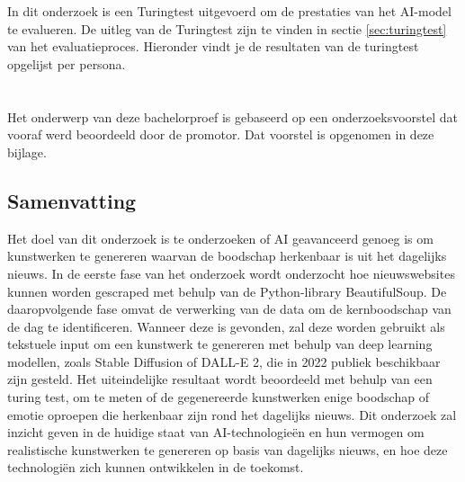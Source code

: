 \documentclass[dutch,dit,thesis]{hogentreport}
\begin{document}








%
%



\appendix
\chapter{}%
\label{ch:code_fragments}



\chapter{}%
In dit onderzoek is een Turingtest uitgevoerd om de prestaties van het AI-model te evalueren. De uitleg van de Turingtest zijn te vinden in sectie \ref{sec:turingtest} van het evaluatieproces. Hieronder vindt je de resultaten van de turingtest opgelijst per persona. 


\chapter{}%
Het onderwerp van deze bachelorproef is gebaseerd op een onderzoeksvoorstel dat vooraf werd beoordeeld door de promotor. Dat voorstel is opgenomen in deze bijlage.


\section*{Samenvatting}
Het doel van dit onderzoek is te onderzoeken of AI geavanceerd genoeg is om kunstwerken te genereren waarvan de boodschap herkenbaar is uit het dagelijks nieuws. In de eerste fase van het onderzoek wordt onderzocht hoe nieuwswebsites kunnen worden gescraped met behulp van de Python-library BeautifulSoup. De daaropvolgende fase omvat de verwerking van de data om de kernboodschap van de dag te identificeren. Wanneer deze is gevonden, zal deze worden gebruikt als tekstuele input om een kunstwerk te genereren met behulp van deep learning modellen, zoals Stable Diffusion of DALL-E 2, die in 2022 publiek beschikbaar zijn gesteld. Het uiteindelijke resultaat wordt beoordeeld met behulp van een turing test, om te meten of de gegenereerde kunstwerken enige boodschap of emotie oproepen die herkenbaar zijn rond het dagelijks nieuws. Dit onderzoek zal inzicht geven in de huidige staat van AI-technologieën en hun vermogen om realistische kunstwerken te genereren op basis van dagelijks nieuws, en hoe deze technologiën zich kunnen ontwikkelen in de toekomst.


\backmatter{}

\setlength\bibitemsep{2pt} %
\printbibliography[heading=bibintoc]
\end{document}
